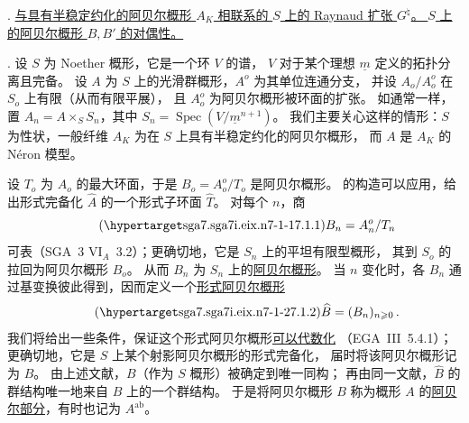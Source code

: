 

\medskip
{}. \underline{与具有半稳定约化的阿贝尔概形 $A_K$ 相联系的 $S$ 上的 Raynaud 扩张 $G^\natural$。
$S$ 上的阿贝尔概形 $B,B'$ 的对偶性。}

\medskip
\noindent
{}. 设 $S$ 为 Noether 概形，它是一个环 $V$ 的谱，
$V$ 对于某个理想 $\underline m$ 定义的拓扑分离且完备。
设 $A$ 为 $S$ 上的光滑群概形，$A^o$ 为其单位连通分支，
并设 $A_o/A_o^o$ 在 $S_o$ 上有限（从而有限平展），
且 $A_o^o$ 为阿贝尔概形被环面的扩张。
如通常一样，置 $A_n=A\times_S S_n$，其中
$S_n=\operatorname{Spec}(V/\underline m^{n+1})$。
我们主要关心这样的情形：$S$ 为性状，一般纤维 $A_K$ 为在 $S$ 上具有半稳定约化的阿贝尔概形，
而 $A$ 是 $A_K$ 的 N\'eron 模型。

设 $T_o$ 为 $A_o$ 的最大环面，于是 $B_o=A_o^o/T_o$ 是阿贝尔概形。
 的构造可以应用，给出形式完备化 $\widehat A$ 的一个形式子环面 $\widehat T$。
对每个 $n$，商
\begin{equation}\tag{\SGARefTarget{sga7.sga7i.eix.n7-1-1}{7.1.1}}
 B_n=A_n^o/T_n
\end{equation}
可表（SGA~3 $\mathrm{VI}_A$~3.2）；更确切地，它是 $S_n$ 上的平坦有限型概形，
其到 $S_o$ 的拉回为阿贝尔概形 $B_o$。
从而 $B_n$ 为 $S_n$ 上的\underline{阿贝尔概形}。
当 $n$ 变化时，各 $B_n$ 通过基变换彼此得到，因而定义一个\underline{形式阿贝尔概形}
\begin{equation}\tag{\SGARefTarget{sga7.sga7i.eix.n7-1-2}{7.1.2}}
 \widehat B=(B_n)_{n\geqslant0}\,.
\end{equation}
我们将给出一些条件，保证这个形式阿贝尔概形\underline{可以代数化}
（EGA~III~5.4.1）；更确切地，它是 $S$ 上某个射影阿贝尔概形的形式完备化，
届时将该阿贝尔概形记为 $B$。
由上述文献，$B$（作为 $S$ 概形）被确定到唯一同构；
再由同一文献，$\widehat B$ 的群结构唯一地来自 $B$ 上的一个群结构。
于是将阿贝尔概形 $B$ 称为概形 $A$ 的\underline{阿贝尔部分}，有时也记为 $A^{\mathrm{ab}}$。

